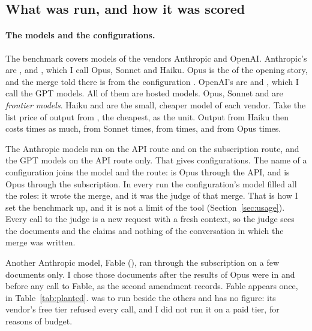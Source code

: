 \subsection{What was run, and how it was scored}

\paragraph{The models and the configurations.} The benchmark covers models of the vendors Anthropic and OpenAI. Anthropic's are \texttt{}, \texttt{} and \texttt{}, which I call Opus, Sonnet and Haiku. Opus is the  of the opening story, and the merge told there is from the configuration \texttt{}. OpenAI's are \texttt{} and \texttt{}, which I call the GPT models. All of them are hosted models. Opus, Sonnet and \texttt{} are \emph{frontier models}. Haiku and \texttt{} are the small, cheaper model of each vendor. Take the list price of output from \texttt{}, the cheapest, as the unit. Output from Haiku then costs  times as much, from Sonnet  times, from \texttt{}  times, and from Opus  times.

The Anthropic models ran on the API route and on the subscription route, and the GPT models on the API route only. That gives  configurations. The name of a configuration joins the model and the route: \texttt{} is Opus through the API, and \texttt{} is Opus through the subscription. In every run the configuration's model filled all the roles: it wrote the merge, and it was the judge of that merge. That is how I set the benchmark up, and it is not a limit of the tool (Section~\ref{sec:usage}). Every call to the judge is a new request with a fresh context, so the judge sees the documents and the claims and nothing of the conversation in which the merge was written.

Another Anthropic model, Fable (\texttt{}), ran through the subscription on a few documents only. I chose those documents after the results of Opus were in and before any call to Fable, as the second amendment records. Fable appears once, in Table~\ref{tab:planted}.  was to run beside the others and has no figure: its vendor's free tier refused every call, and I did not run it on a paid tier, for reasons of budget.

